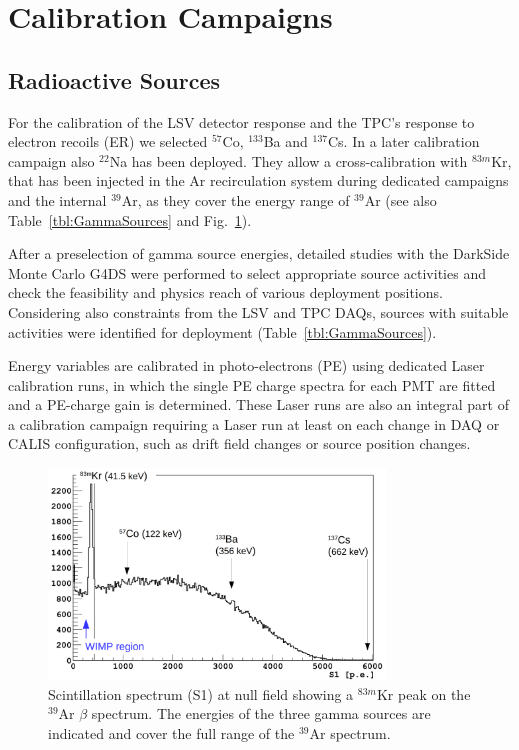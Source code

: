 \section{Calibration Campaigns}\label{sec:CalibCampaigns}
\subsection{Radioactive Sources}
For the calibration of the LSV detector response and the TPC's response to electron recoils (ER) we selected $^{57}$Co, $^{133}$Ba and $^{137}$Cs. In a later calibration campaign also $^{22}$Na has been deployed. They allow a cross-calibration with $^{83m}$Kr, that has been injected in the Ar recirculation system during dedicated campaigns and the internal $^{39}$Ar, as they cover the energy range of $^{39}$Ar (see also Table~\ref{tbl:GammaSources} and Fig.~\ref{fig:GammaSources_Ar39spectrum}). %

After a preselection of gamma source energies, detailed studies with the DarkSide Monte Carlo G4DS \cite{DS50:G4DS:paper} were performed to select appropriate source activities and check the feasibility and physics reach of various deployment positions. Considering also constraints from the LSV and TPC DAQs, sources with suitable activities were identified for deployment (Table~\ref{tbl:GammaSources}).

Energy variables are calibrated in photo-electrons (PE) using dedicated Laser calibration runs, in which the single PE charge spectra for each PMT are fitted and a PE-charge gain is determined. 
These Laser runs are also an integral part of a calibration campaign requiring a Laser run at least on each change in DAQ or CALIS configuration, such as drift field changes or source position changes.

\begin{figure}[htbp]
 \centering
 \includegraphics[width=0.8\textwidth]{Figures/GammaSources_Ar39spectrum.png}
 \caption{Scintillation spectrum (S1) at null field showing a $^{83m}$Kr peak on the $^{39}$Ar $\beta$ spectrum. The energies of the three gamma sources are indicated and cover the full range of the $^{39}$Ar spectrum.
\label{fig:GammaSources_Ar39spectrum}}
\end{figure}

